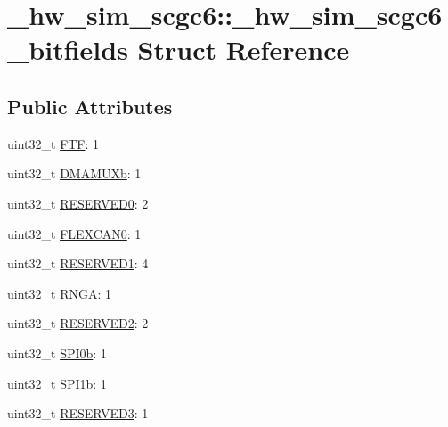 \hypertarget{struct__hw__sim__scgc6_1_1__hw__sim__scgc6__bitfields}{}\section{\+\_\+hw\+\_\+sim\+\_\+scgc6\+:\+:\+\_\+hw\+\_\+sim\+\_\+scgc6\+\_\+bitfields Struct Reference}
\label{struct__hw__sim__scgc6_1_1__hw__sim__scgc6__bitfields}
\subsection*{Public Attributes}
\begin{DoxyCompactItemize}
\item 
uint32\+\_\+t \hyperlink{struct__hw__sim__scgc6_1_1__hw__sim__scgc6__bitfields_a57d79b775521160e059702e4cc51485f}{F\+TF}\+: 1
\item 
uint32\+\_\+t \hyperlink{struct__hw__sim__scgc6_1_1__hw__sim__scgc6__bitfields_a909c111c9326cdbe1fece2b064287da0}{D\+M\+A\+M\+U\+Xb}\+: 1
\item 
uint32\+\_\+t \hyperlink{struct__hw__sim__scgc6_1_1__hw__sim__scgc6__bitfields_a03619805f4fe6486ca4d31071c0898e9}{R\+E\+S\+E\+R\+V\+E\+D0}\+: 2
\item 
uint32\+\_\+t \hyperlink{struct__hw__sim__scgc6_1_1__hw__sim__scgc6__bitfields_aeec2979617afc81542117353d82504a4}{F\+L\+E\+X\+C\+A\+N0}\+: 1
\item 
uint32\+\_\+t \hyperlink{struct__hw__sim__scgc6_1_1__hw__sim__scgc6__bitfields_a6b3c5cc89fcae3f4f5a8d0b32a8a4061}{R\+E\+S\+E\+R\+V\+E\+D1}\+: 4
\item 
uint32\+\_\+t \hyperlink{struct__hw__sim__scgc6_1_1__hw__sim__scgc6__bitfields_a88550342c71bae6083d01f6c24ab41a5}{R\+N\+GA}\+: 1
\item 
uint32\+\_\+t \hyperlink{struct__hw__sim__scgc6_1_1__hw__sim__scgc6__bitfields_a332537810094b768c0d95c5af36ea626}{R\+E\+S\+E\+R\+V\+E\+D2}\+: 2
\item 
uint32\+\_\+t \hyperlink{struct__hw__sim__scgc6_1_1__hw__sim__scgc6__bitfields_a2b083995477885b0363c3b4192821a27}{S\+P\+I0b}\+: 1
\item 
uint32\+\_\+t \hyperlink{struct__hw__sim__scgc6_1_1__hw__sim__scgc6__bitfields_acb175da00befcd5fd2fe73d3511f17b5}{S\+P\+I1b}\+: 1
\item 
uint32\+\_\+t \hyperlink{struct__hw__sim__scgc6_1_1__hw__sim__scgc6__bitfields_acd49edf5c77f501f530083b84bf9bb6d}{R\+E\+S\+E\+R\+V\+E\+D3}\+: 1

\end{DoxyCompactItemize}
